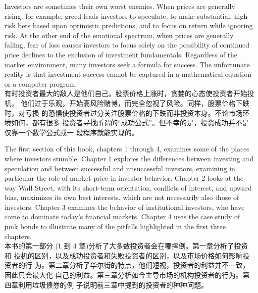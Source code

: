 \begin{verseparallel}
  {
    Investors are sometimes their own worst enemies. When prices are generally
    rising, for example, greed leads investors to speculate, to make
    substantial, high-risk bets based upon optimistic predictions, and to focus
    on return while ignoring risk. At the other end of the emotional spectrum,
    when prices are generally falling, fear of loss causes investors to focus
    solely on the possibility of continued price declines to the exclusion of
    investment fundamentals. Regardless of the market environment, many
    investors seek a formula for success. The unfortunate reality is that
    investment success cannot be captured in a mathematical equation or a
    computer program. \\
  }
  {
    有时投资者最大的敌人是他们自己。股票价格上涨时，贪婪的心态使投资者开始投机，
    他们过于乐观，开始高风险赌博，而完全忽视了风险。同样，股票价格下跌时，对亏损
    的恐惧使投资者过分关注股票价格的下跌而非投资本身。不论市场环境如何，都有很多
    投资者寻找所谓的“成功公式”。但不幸的是，投资成功并不是仅靠一个数学公式或一
    段程序就能实现的。
  }
\end{verseparallel}

\begin{verseparallel}
  {
    The first section of this book, chapters 1 through 4, examines some of the
    places where investors stumble. Chapter 1 explores the differences between
    investing and speculation and between successful and unsuccessful investors,
    examining in particular the role of market price in investor behavior.
    Chapter 2 looks at the way Wall Street, with its short-term orientation,
    conflicts of interest, and upward bias, maximizes its own best interests,
    which are not necessarily also those of investors. Chapter 3 examines the
    behavior of institutional investors, who have come to dominate today's
    financial markets. Chapter 4 uses the case study of junk bonds to illustrate
    many of the pitfalls highlighted in the first three chapters. \\
  }
  {
    本书的第一部分{} (1 到 4 章)分析了大多数投资者会在哪摔倒。第一章分析了投资和
    投机的区别，以及成功投资者和失败投资者的区别，以及市场价格如何影响投资者的行
    为。第二章分析了华尔街的特点，他们短视，投资者的利益并不一致，因此只会最大化
    自己的利益。第三章分析如今主导市场的机构投资者的行为。第四章利用垃圾债券的例
    子说明前三章中提到的投资者的种种问题。
  }
\end{verseparallel}


